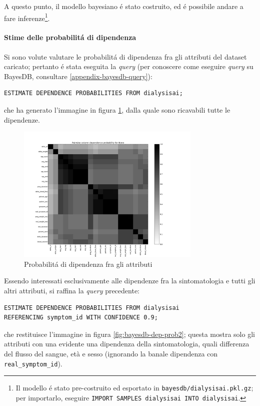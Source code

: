 \documentclass[preprint]{acm_proc_article-sp}
\begin{document}
A questo punto, il modello bayesiano \'e stato costruito, ed \'e possibile andare a fare inferenze\footnote{Il modello \'e stato pre-costruito ed esportato in \verb|bayesdb/dialysisai.pkl.gz|; per importarlo, eseguire \verb|IMPORT SAMPLES dialysisai INTO dialysisai|.}.

\paragraph{Stime delle probabilit\'a di dipendenza}
Si sono volute valutare le probabilit\'a di dipendenza fra gli attributi del dataset caricato; pertanto \'e stata eseguita la \textit{query} (per conoscere come eseguire \textit{query} su BayesDB, consultare \ref{appendix-bayesdb-query}):
\begin{verbatim}
ESTIMATE DEPENDENCE PROBABILITIES FROM dialysisai;
\end{verbatim}
che ha generato l'immagine in figura \ref{fig:bayesdb-dep-prob1}, dalla quale sono ricavabili tutte le dipendenze.

\begin{figure}[!htb]
\centering
\includegraphics[width=250pt]{../bayesdb/dialysis_prob_dependencies.png}
\caption{Probabilit\'a di dipendenza fra gli attributi}
\label{fig:bayesdb-dep-prob1}
\end{figure}

Essendo interessati esclusivamente alle dipendenze fra la sintomatologia e tutti gli altri attributi, si raffina la \textit{query} precedente:
\begin{verbatim}
ESTIMATE DEPENDENCE PROBABILITIES FROM dialysisai
REFERENCING symptom_id WITH CONFIDENCE 0.9;
\end{verbatim}
che restituisce l'immagine in figura \ref{fig:bayesdb-dep-prob2}; questa mostra solo gli attributi con una evidente una dipendenza della sintomatologia, quali differenza del flusso del sangue, età e sesso (ignorando la banale dipendenza con \verb|real_symptom_id|).
\end{document}
